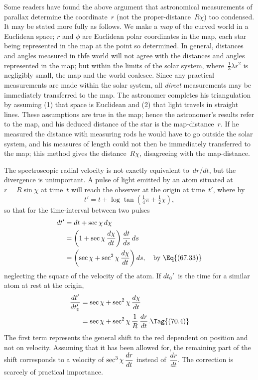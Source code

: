 \documentclass[12pt]{book}
\begin{document}
Some readers have found the above argument that astronomical measurements of parallax determine the coordinate~$r$
(not the proper\hyp{}distance~$R\chi$) too condensed.
It may be stated more fully as follows.
We make a \emph{map} of the curved world in a Euclidean space;
$r$ and $\phi$ are Euclidean polar coordinates in the map, each star being represented in the map at
the point so determined.
In general, distances and angles measured in thfe world will not agree with the distances and angles represented in
the map; but within the limits of the solar system, where~$\tfrac{1}{3}\lambda r^2$ is negligibly small,
the map and the world coalesce.
Since any practical measurements are made within the solar system, all \emph{direct} measurements may be immediately
transferred to the map.
The astronomer completes his triangulation by assuming (1) that space is Euclidean and (2) that light travels in
straight lines.
These assumptions are true in the map; hence the astronomer's results refer to the map, and his deduced distance
of the star is the map\hyp{}distance~$r$.
If he measured the distance with measuring rods he would have to go outside the solar system, and his measures
of length could not then be immediately transferred to the map;
this method gives the distance~$R\chi$, disagreeing with the map\hyp{}distance.

The spectroscopic radial velocity is not exactly equivalent to~$dr/dt$, but
%
the divergence is unimportant. A pulse of light emitted by an atom situated
at $r = R\sin\chi$ at time~$t$ will reach the observer at the origin at time~$t'$, where
by~
\[
t' = t + \log\tan(\tfrac{1}{4}\pi + \tfrac{1}{2}\chi),
\]
so that for the time\hyp{}interval between two pulses
\begin{align*}
dt' &= dt + \sec\chi\, d\chi \\
&= \left(1 + \sec\chi\, \frac{d\chi}{dt}\right) \frac{dt}{ds}\, ds \\
&= \left(\sec\chi + \sec^2\chi\, \frac{d\chi}{dt}\right) ds,
\quad\text{by~\Eq{(67.33)}}
\end{align*}
%
neglecting the square of the velocity of the atom. If $dt_{0}'$~is the time for a
similar atom at rest at the origin,
\begin{align*}
  \frac{dt'}{dt_{0}'}
  &= \sec\chi + \sec^2\chi\, \frac{d\chi}{dt} \\
  &= \sec\chi + \sec^2\chi\, \frac{1}{R}\, \frac{dr}{dt}.
  \Tag{(70.4)}
\end{align*}
The first term represents the general shift to the red dependent on position
and not on velocity. Assuming that it has been allowed for, the remaining
part of the shift corresponds to a velocity of $\smash[b]{\sec^{3}\chi\, \dfrac{dr}{dt}}$ instead of~$\dfrac{dr}{dt}$. The
correction is scarcely of practical importance.
\end{document}
